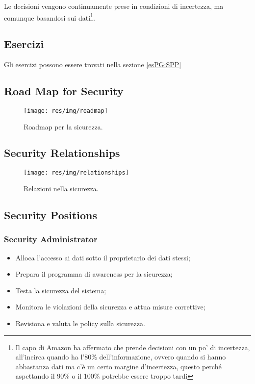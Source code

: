 Le decisioni vengono continuamente prese in condizioni di incertezza, ma
comunque basandosi sui dati\footnote{Il capo di Amazon ha affermato che prende
decisioni con un po' di incertezza, all'incirca quando ha l'80\%
dell'informazione, ovvero quando si hanno abbastanza dati ma c'è un certo
margine d'incertezza, questo perché aspettando il 90\% o il 100\% potrebbe essere
troppo tardi}.


\subsection{Esercizi}

Gli esercizi possono essere trovati nella sezione \ref{esPG:SPP}
\newpage
\subsection{Road Map for Security}

\begin{figure}[h!]
        \begin{center}
                \texttt{[image: res/img/roadmap]}
        \end{center}
        \caption{Roadmap per la sicurezza.}
\end{figure}

\subsection{Security Relationships}

\begin{figure}[h!]
        \begin{center}
                \texttt{[image: res/img/relationships]}
        \end{center}
        \caption{Relazioni nella sicurezza.}
\end{figure}


\subsection{Security Positions}

\subsubsection{Security Administrator}

\begin{itemize}
\item Alloca l'accesso ai dati sotto il proprietario dei dati stessi;
\item Prepara il programma di awareness per la sicurezza;
\item Testa la sicurezza del sistema;
\item Monitora le violazioni della sicurezza e attua misure correttive;
\item Revisiona e valuta le policy sulla sicurezza.
\end{itemize}

